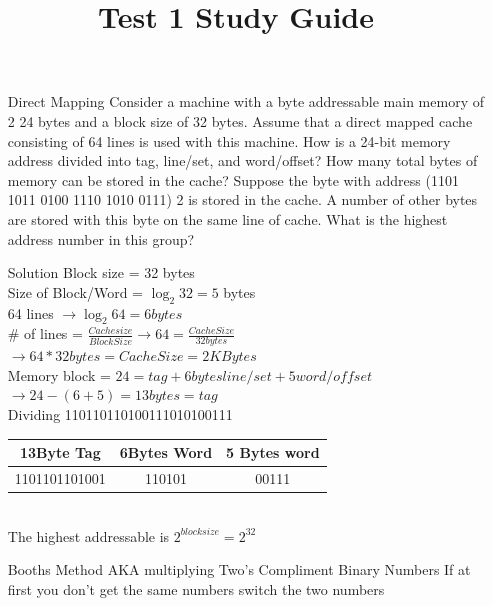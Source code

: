 \documentclass[12pt,largemargins]{article}
\title{Test 1 Study Guide}
\begin{document}
\maketitle

\begin{itemize}
\item[Direct Mapping] 
Consider a machine with a byte addressable main memory of 2 24 bytes and a block size of 32
bytes. Assume that a direct mapped cache consisting of 64 lines is used with this machine. How
is a 24-bit memory address divided into tag, line/set, and word/offset?
How many total bytes of memory can be stored in the cache?
Suppose the byte with address (1101 1011 0100 1110 1010 0111) 2 is stored in the cache. A
number of other bytes are stored with this byte on the same line of cache. What is the highest
address number in this group?
\item[Solution]
Block size = 32 bytes\\
Size of Block/Word = $\log_2 32 = 5$ bytes\\
64 lines $\rightarrow \log_2 64 = 6bytes$\\
\# of lines = $\frac{Cache size}{Block Size} \rightarrow 64 = \frac{Cache Size}{32 bytes}$\\
$\rightarrow 64 * 32 bytes = Cache Size = 2KBytes$\\
Memory block = $24 = tag + 6bytes line/set + 5 word/offset$\\
$\rightarrow 24 - (6+5) = 13bytes = tag$\\
Dividing 110110110100111010100111\\
\begin{tabular}{|c|c|c|}
\hline
13Byte Tag & 6Bytes Word & 5 Bytes word\\
\hline
1101101101001&110101&00111\\
\hline
\end{tabular}\\
The highest addressable is $2^{block size} = 2^{32}$\\
\newpage
\item[Booths Method]
AKA multiplying Two's Compliment Binary Numbers
If at first you don't get the same numbers switch the two numbers\\

\end{itemize}
\end{document}
